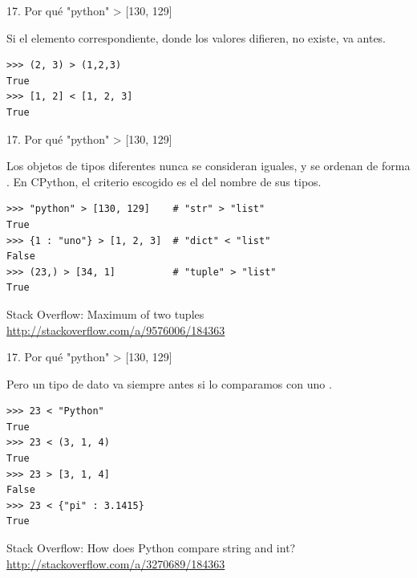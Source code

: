 \documentclass[14pt]{beamer}
\begin{document}
\begin{frame}[fragile]{17. Por qué "python" > [130, 129]}
  \small
  \begin{block}{}
    \centering
    Si el elemento correspondiente, donde los valores difieren, no
    existe,  va antes.
  \end{block}

  \begin{exampleblock}{}
    \begin{lstlisting}
>>> (2, 3) > (1,2,3)
True
>>> [1, 2] < [1, 2, 3]
True
    \end{lstlisting}
  \end{exampleblock}
\end{frame}

\begin{frame}[fragile]{17. Por qué "python" > [130, 129]}
  \small
  \begin{alertblock}{}
    \centering
    Los objetos de tipos diferentes nunca se consideran iguales, y se
    ordenan de forma . En
    CPython, el criterio escogido es el del nombre de sus tipos.
  \end{alertblock}

  \footnotesize
  \begin{exampleblock}{}
    \begin{lstlisting}[escapechar=!]
>>> "python" > [130, 129]    # "str" > "list"
True
>>> {1 : "uno"} > [1, 2, 3]  # "dict" < "list"
False
>>> (23,) > [34, 1]          # "tuple" > "list"
True
    \end{lstlisting}
  \end{exampleblock}

  \begin{block}
    {\centering Stack Overflow: Maximum of two tuples}
    \centering \url{http://stackoverflow.com/a/9576006/184363}
  \end{block}
\end{frame}

\begin{frame}[fragile]{17. Por qué "python" > [130, 129]}
  \begin{block}{}
    \centering
    Pero un tipo de dato  va siempre antes si lo
    comparamos con uno .
  \end{block}

  \footnotesize
  \begin{exampleblock}{}
    \begin{lstlisting}
>>> 23 < "Python"
True
>>> 23 < (3, 1, 4)
True
>>> 23 > [3, 1, 4]
False
>>> 23 < {"pi" : 3.1415}
True
    \end{lstlisting}
  \end{exampleblock}

  \begin{block}
    {\centering Stack Overflow: How does Python compare string and int?}
    \centering \url{http://stackoverflow.com/a/3270689/184363}
  \end{block}
\end{frame}
\end{document}
